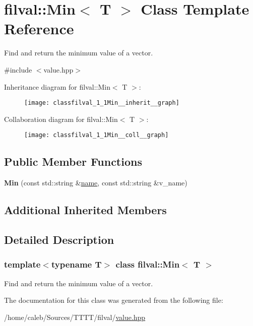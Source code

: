 \hypertarget{classfilval_1_1Min}{}\section{filval\+:\+:Min$<$ T $>$ Class Template Reference}
\label{classfilval_1_1Min}


Find and return the minimum value of a vector.  




{\ttfamily \#include $<$value.\+hpp$>$}



Inheritance diagram for filval\+:\+:Min$<$ T $>$\+:
\nopagebreak
\begin{figure}[H]
\begin{center}
\leavevmode
\texttt{[image: classfilval\_1\_1Min\_\_inherit\_\_graph]}
\end{center}
\end{figure}


Collaboration diagram for filval\+:\+:Min$<$ T $>$\+:
\nopagebreak
\begin{figure}[H]
\begin{center}
\leavevmode
\texttt{[image: classfilval\_1\_1Min\_\_coll\_\_graph]}
\end{center}
\end{figure}
\subsection*{Public Member Functions}
\begin{DoxyCompactItemize}
\item 
\hypertarget{classfilval_1_1Min_a4a3ddfb7bca65ab7a48fbdaac6b18b74}{}\label{classfilval_1_1Min_a4a3ddfb7bca65ab7a48fbdaac6b18b74} 
{\bfseries Min} (const std\+::string \&\hyperlink{classfilval_1_1GenValue_a007e38c03ee041c2a657afa3d6e91ab1}{name}, const std\+::string \&v\+\_\+name)
\end{DoxyCompactItemize}
\subsection*{Additional Inherited Members}


\subsection{Detailed Description}
\subsubsection*{template$<$typename T$>$\newline
class filval\+::\+Min$<$ T $>$}

Find and return the minimum value of a vector. 

The documentation for this class was generated from the following file\+:\begin{DoxyCompactItemize}
\item 
/home/caleb/\+Sources/\+T\+T\+T\+T/filval/\hyperlink{value_8hpp}{value.\+hpp}\end{DoxyCompactItemize}
